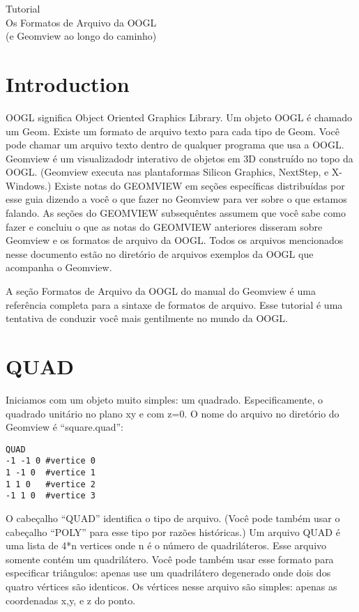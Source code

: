 \documentclass[12pt,a4paper]{book}
\begin{document}

\vspace*{6cm}
\huge
\begin{center}
Tutorial\\
Os Formatos de Arquivo da OOGL\\
(e Geomview ao longo do caminho)
\end{center}
\normalsize
\vspace*{5cm}
\newpage
\chapter{Introduction}

OOGL significa Object Oriented Graphics Library.  Um objeto OOGL é
chamado um Geom. Existe um formato de arquivo texto para cada tipo de Geom. Você
pode chamar um arquivo texto dentro de qualquer programa que usa a OOGL. Geomview é um
visualizadodr interativo de objetos em 3D construído no topo da OOGL. (Geomview executa nas
plantaformas Silicon Graphics, NextStep, e X-Windows.) Existe
notas do GEOMVIEW em seções específicas distribuídas por esse guia dizendo
a você o que fazer no Geomview para ver sobre o que estamos falando. As seções do GEOMVIEW
subsequêntes assumem que você sabe como fazer e concluiu o que as notas do GEOMVIEW anteriores
disseram sobre Geomview e os formatos de arquivo da OOGL. Todos os arquivos mencionados nesse documento estão no
diretório de arquivos exemplos da OOGL que acompanha o Geomview.

A seção Formatos de Arquivo da OOGL do manual do Geomview é uma referência
completa para a sintaxe de formatos de arquivo. Esse tutorial é uma tentativa
de conduzir você mais gentilmente no mundo da OOGL.

\chapter{QUAD}

Iniciamos com um objeto muito simples: um quadrado. Especificamente, o quadrado
unitário no plano xy e com z=0. O nome do arquivo no diretório do Geomview é ``square.quad'':

\begin{verbatim}
QUAD
-1 -1 0 #vertice 0
1 -1 0  #vertice 1
1 1 0   #vertice 2
-1 1 0  #vertice 3
\end{verbatim}

O cabeçalho ``QUAD'' identifica o tipo de arquivo.  (Você pode também usar o
cabeçalho ``POLY'' para esse tipo por razões históricas.)  Um arquivo QUAD é uma
lista de 4*n vertices onde n é o número de quadriláteros. Esse
arquivo somente contém um quadrilátero.  Você pode também usar esse formato para
especificar triângulos: apenas use um quadrilátero degenerado onde dois dos
quatro vértices são identicos.  Os vértices nesse arquivo são
simples: apenas as coordenadas x,y, e z do ponto.
\end{document}
